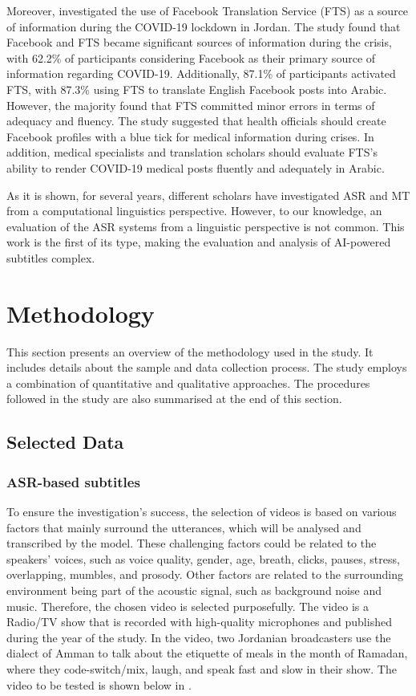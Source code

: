 \documentclass[english]{textolivre}
\begin{document}
Moreover, \textcite{almahasees_facebook_2020}
investigated the use of Facebook Translation Service (FTS) as a source
of information during the COVID-19 lockdown in Jordan. The study found
that Facebook and FTS became significant sources of information during
the crisis, with 62.2\% of participants considering Facebook as their
primary source of information regarding COVID-19. Additionally, 87.1\%
of participants activated FTS, with 87.3\% using FTS to translate
English Facebook posts into Arabic. However, the majority found that FTS
committed minor errors in terms of adequacy and fluency. The study
suggested that health officials should create Facebook profiles with a
blue tick for medical information during crises. In addition, medical
specialists and translation scholars should evaluate FTS's ability to
render COVID-19 medical posts fluently and adequately in Arabic.

As it is shown, for several years, different scholars have investigated
ASR and MT from a computational linguistics perspective. However, to our
knowledge, an evaluation of the ASR systems from a linguistic
perspective is not common. This work is the first of its type, making
the evaluation and analysis of AI-powered subtitles complex.

\section{Methodology}\label{methodology}
	
This section presents an overview of the methodology used in the study.
It includes details about the sample and data collection process. The
study employs a combination of quantitative and qualitative approaches.
The procedures followed in the study are also summarised at the end of
this section.


\subsection{Selected Data}\label{subsec-Selected-Data}
\subsubsection{ASR-based subtitles}\label{subsubsec-ASR-based-subtitles}

To ensure the investigation's success, the selection of videos is based
on various factors that mainly surround the utterances, which will be
analysed and transcribed by the model. These challenging factors could
be related to the speakers' voices, such as voice quality, gender, age,
breath, clicks, pauses, stress, overlapping, mumbles, and prosody. Other
factors are related to the surrounding environment being part of the
acoustic signal, such as background noise and music. Therefore, the
chosen video is selected purposefully. The video is a Radio/TV show that
is recorded with high-quality microphones and published during the year
of the study. In the video, two Jordanian broadcasters use the dialect
of Amman to talk about the etiquette of meals in the month of Ramadan,
where they code-switch/mix, laugh, and speak fast and slow in their
show. The video to be tested is shown below in .
\end{document}
